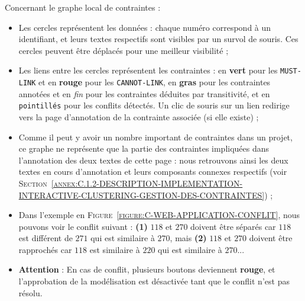 			Concernant le graphe local de contraintes :
			\begin{itemize}
				\item Les cercles représentent les données : chaque numéro correspond à un identifiant, et leurs textes respectifs sont visibles par un survol de souris.
				Ces cercles peuvent être déplacés pour une meilleur visibilité ;
				\item Les liens entre les cercles représentent les contraintes : en \textcolor{colorApplicationMUSTLINK}{\textbf{vert}} pour les \texttt{MUST-LINK} et en \textcolor{colorApplicationCANNOTLINK}{\textbf{rouge}} pour les \texttt{CANNOT-LINK}, en \textbf{gras} pour les contraintes annotées et en \textit{fin} pour les contraintes déduites par transitivité, et en \texttt{pointillés} pour les conflits détectés.
				Un clic de souris sur un lien redirige vers la page d'annotation de la contrainte associée (si elle existe) ;
				\item Comme il peut y avoir un nombre important de contraintes dans un projet, ce graphe ne représente que la partie des contraintes impliquées dans l'annotation des deux textes de cette page : nous retrouvons ainsi les deux textes en cours d'annotation et leurs composants connexes respectifs (voir \textsc{Section~\ref{annex:C.1.2-DESCRIPTION-IMPLEMENTATION-INTERACTIVE-CLUSTERING-GESTION-DES-CONTRAINTES}}) ;
				\item Dans l'exemple en \textsc{Figure~\ref{figure:C-WEB-APPLICATION-CONFLIT}}, nous pouvons voir le conflit suivant : \textbf{(1)} $118$ et $270$ doivent être séparés car $118$ est différent de $271$ qui est similaire à $270$, mais \textbf{(2)} $118$ et $270$ doivent être rapprochés car $118$ est similaire à $220$ qui est similaire à $270$...
				\item \textbf{Attention} : En cas de conflit, plusieurs boutons deviennent \textcolor{colorApplicationERROR}{\textbf{rouge}}, et l'approbation de la modélisation est désactivée tant que le conflit n'est pas résolu.
			\end{itemize}